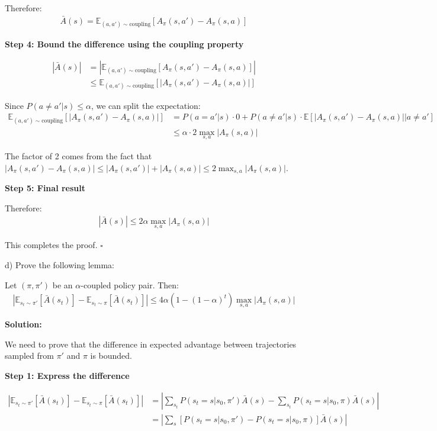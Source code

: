 Therefore:
\begin{align}
\bar{A}(s) = \mathbb{E}_{(a,a') \sim \text{coupling}}[A_{\pi}(s, a') - A_{\pi}(s, a)]
\end{align}

\textbf{Step 4: Bound the difference using the coupling property}

\begin{align}
|\bar{A}(s)| &= \left| \mathbb{E}_{(a,a') \sim \text{coupling}}[A_{\pi}(s, a') - A_{\pi}(s, a)] \right| \\
&\le \mathbb{E}_{(a,a') \sim \text{coupling}}[|A_{\pi}(s, a') - A_{\pi}(s, a)|]
\end{align}

Since $P(a \neq a'|s) \le \alpha$, we can split the expectation:
\begin{align}
\mathbb{E}_{(a,a') \sim \text{coupling}}[|A_{\pi}(s, a') - A_{\pi}(s, a)|] &= P(a = a'|s) \cdot 0 + P(a \neq a'|s) \cdot \mathbb{E}[|A_{\pi}(s, a') - A_{\pi}(s, a)| | a \neq a'] \\
&\le \alpha \cdot 2\max_{s, a}|A_{\pi}(s,a)|
\end{align}

The factor of 2 comes from the fact that $|A_{\pi}(s, a') - A_{\pi}(s, a)| \le |A_{\pi}(s, a')| + |A_{\pi}(s, a)| \le 2\max_{s, a}|A_{\pi}(s,a)|$.

\textbf{Step 5: Final result}

Therefore:
\begin{align}
|\bar{A}(s)| \le 2\alpha \max_{s, a}|A_{\pi}(s,a)|
\end{align}

This completes the proof. $\square$

d) Prove the following lemma:

\begin{lemma}
    Let $(\pi, \pi')$ be an $\alpha$-coupled policy pair. Then:
    \begin{align*}
        |\mathbb{E}_{s_t \sim \pi'}[\bar{A}(s_t)] - \mathbb{E}_{s_t \sim \pi}[\bar{A}(s_t)]| \le 4\alpha(1-(1-\alpha)^t)\max_{s, a}|A_\pi(s, a)|
    \end{align*}
\end{lemma}

\textbf{Solution:}

We need to prove that the difference in expected advantage between trajectories sampled from $\pi'$ and $\pi$ is bounded.

\textbf{Step 1: Express the difference}

\begin{align}
|\mathbb{E}_{s_t \sim \pi'}[\bar{A}(s_t)] - \mathbb{E}_{s_t \sim \pi}[\bar{A}(s_t)]| &= \left| \sum_{s_t} P(s_t = s | s_0, \pi') \bar{A}(s) - \sum_{s_t} P(s_t = s | s_0, \pi) \bar{A}(s) \right| \\
&= \left| \sum_{s} [P(s_t = s | s_0, \pi') - P(s_t = s | s_0, \pi)] \bar{A}(s) \right|
\end{align}

